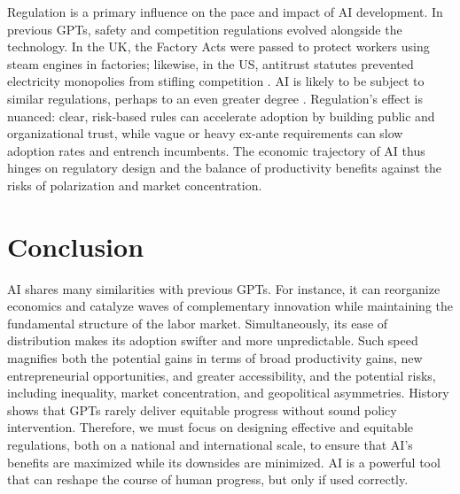 Regulation is a primary influence on the pace and impact of AI development. In previous GPTs, safety and competition regulations evolved alongside the technology. In the UK, the Factory Acts were passed to protect workers using steam engines in factories; likewise, in the US, antitrust statutes prevented electricity monopolies from stifling competition \autocite{UKParliamentFactoryAct1833}. AI is likely to be subject to similar regulations, perhaps to an even greater degree \autocite[pp.\ 9--10]{ErdilBesiroglu2023ExplosiveGrowthAIAutomation}. Regulation’s effect is nuanced: clear, risk-based rules can accelerate adoption by building public and organizational trust, while vague or heavy ex-ante requirements can slow adoption rates and entrench incumbents. The economic trajectory of AI thus hinges on regulatory design and the balance of productivity benefits against the risks of polarization and market concentration.

\section{Conclusion}

AI shares many similarities with previous GPTs. For instance, it can reorganize economics and catalyze waves of complementary innovation while maintaining the fundamental structure of the labor market. Simultaneously, its ease of distribution makes its adoption swifter and more unpredictable. Such speed magnifies both the potential gains in terms of broad productivity gains, new entrepreneurial opportunities, and greater accessibility, and the potential risks, including inequality, market concentration, and geopolitical asymmetries. History shows that GPTs rarely deliver equitable progress without sound policy intervention. Therefore, we must focus on designing effective and equitable regulations, both on a national and international scale, to ensure that AI’s benefits are maximized while its downsides are minimized. AI is a powerful tool that can reshape the course of human progress, but only if used correctly.


